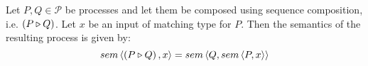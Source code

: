 



\begin{definition}
\label{def:sem_sequence}
Let $P, Q \in \mathcal{P}$ be processes and let them be composed using sequence composition, i.e. $\left( P \triangleright Q \right)$. Let $x$ be an input of matching type for $P$. Then the semantics of the resulting process is given by:
  \begin{equation}
    \label{eqn:sem_sequence}
    sem \left\langle \left( P \triangleright Q \right), x \right\rangle = sem \left\langle Q, sem \left\langle P, x \right\rangle \right\rangle
  \end{equation}
  \hfill\qedsymbol
\end{definition}

